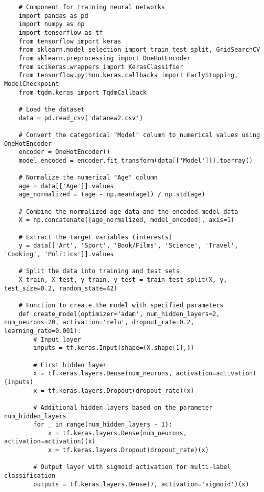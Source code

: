 \begin{lstlisting}
    # Component for training neural networks
    import pandas as pd
    import numpy as np
    import tensorflow as tf
    from tensorflow import keras
    from sklearn.model_selection import train_test_split, GridSearchCV
    from sklearn.preprocessing import OneHotEncoder
    from scikeras.wrappers import KerasClassifier
    from tensorflow.python.keras.callbacks import EarlyStopping, ModelCheckpoint
    from tqdm.keras import TqdmCallback

    # Load the dataset
    data = pd.read_csv('datanew2.csv')

    # Convert the categorical "Model" column to numerical values using OneHotEncoder
    encoder = OneHotEncoder()
    model_encoded = encoder.fit_transform(data[['Model']]).toarray()

    # Normalize the numerical "Age" column
    age = data[['Age']].values
    age_normalized = (age - np.mean(age)) / np.std(age)

    # Combine the normalized age data and the encoded model data
    X = np.concatenate([age_normalized, model_encoded], axis=1)

    # Extract the target variables (interests)
    y = data[['Art', 'Sport', 'Book/Films', 'Science', 'Travel', 'Cooking', 'Politics']].values

    # Split the data into training and test sets
    X_train, X_test, y_train, y_test = train_test_split(X, y, test_size=0.2, random_state=42)

    # Function to create the model with specified parameters
    def create_model(optimizer='adam', num_hidden_layers=2, num_neurons=20, activation='relu', dropout_rate=0.2, learning_rate=0.001):
        # Input layer
        inputs = tf.keras.Input(shape=(X.shape[1],))
        
        # First hidden layer
        x = tf.keras.layers.Dense(num_neurons, activation=activation)(inputs)
        x = tf.keras.layers.Dropout(dropout_rate)(x)
        
        # Additional hidden layers based on the parameter num_hidden_layers
        for _ in range(num_hidden_layers - 1):
            x = tf.keras.layers.Dense(num_neurons, activation=activation)(x)
            x = tf.keras.layers.Dropout(dropout_rate)(x)
        
        # Output layer with sigmoid activation for multi-label classification
        outputs = tf.keras.layers.Dense(7, activation='sigmoid')(x)
        

\end{lstlisting}
